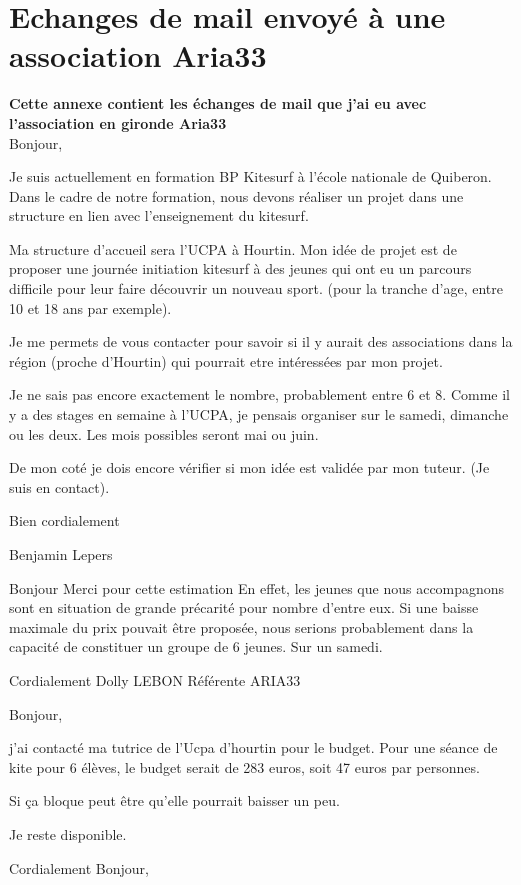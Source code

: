 \documentclass[11pt,a4paper]{report}
\begin{document}
\chapter{Echanges de mail envoyé à une association Aria33}\label{appendix_mail}
\textbf{Cette annexe contient les échanges de mail que j'ai eu avec l'association 
en gironde Aria33\cite{aria33}} \\

Bonjour,

Je suis actuellement en formation BP Kitesurf à l'école nationale de Quiberon.
Dans le cadre de notre formation, nous devons réaliser un projet dans
une structure en lien avec l'enseignement du kitesurf.

Ma structure d'accueil sera l'UCPA à Hourtin.
Mon idée de projet est de proposer une journée initiation kitesurf à
des jeunes qui ont eu un parcours difficile pour leur faire découvrir
un nouveau sport.
(pour la tranche d'age, entre 10 et 18 ans par exemple).

Je me permets de vous contacter pour savoir si il y aurait des
associations dans la région (proche d'Hourtin) qui pourrait etre
intéressées par mon projet.

Je ne sais pas encore exactement le nombre, probablement entre 6 et 8.
Comme il y a des stages en semaine à l'UCPA, je pensais organiser sur
le samedi, dimanche ou les deux. Les mois possibles seront mai ou
juin.

De mon coté je dois encore vérifier si mon idée est validée par mon
tuteur. (Je suis en contact).


Bien cordialement

Benjamin Lepers

\bigskip
Bonjour
Merci pour cette estimation
En effet, les jeunes que nous accompagnons sont en situation de grande
précarité pour nombre d'entre eux. Si une baisse maximale du prix
pouvait être proposée, nous serions probablement dans la capacité
de constituer un groupe de 6 jeunes. Sur un samedi.

Cordialement
Dolly LEBON
Référente ARIA33

\bigskip
Bonjour,

j'ai contacté ma tutrice de l'Ucpa d'hourtin pour le budget.
Pour une séance de kite  pour 6 élèves, le budget serait de 283 euros,
soit 47 euros par personnes.

Si ça bloque peut être qu'elle pourrait baisser un peu.


Je reste disponible.

Cordialement
\bigskip
Bonjour,
\end{document}
